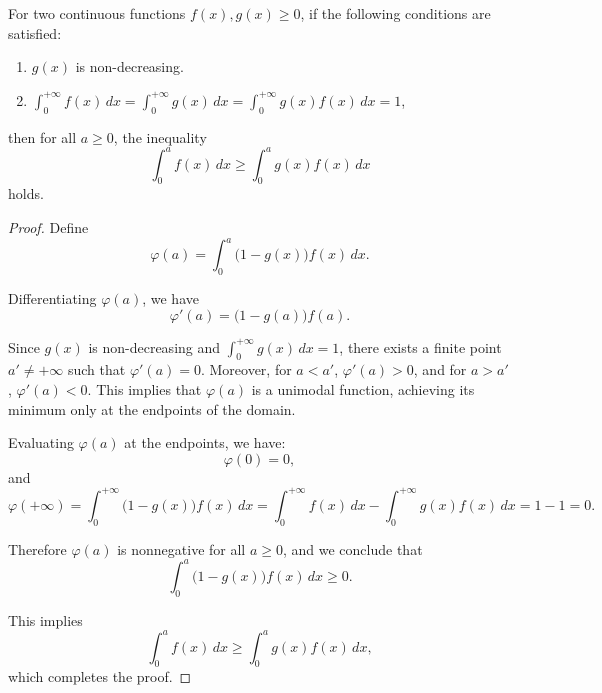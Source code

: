 \begin{lemma}\label{lem:StoDom}
    For two continuous functions \( f(x), g(x) \geq 0 \), if the following conditions are satisfied:
    \begin{enumerate}
        \item \( g(x) \) is non-decreasing.
        \item \( \int_0^{+\infty} f(x) \, dx = \int_0^{+\infty} g(x) \, dx = \int_0^{+\infty} g(x) f(x) \, dx = 1 \),
    \end{enumerate}
    then for all \( a \geq 0 \), the inequality 
    \[
    \int_0^{a} f(x) \, dx \geq \int_0^a g(x) f(x) \, dx
    \]
    holds.
\end{lemma}

\begin{proof}
    Define 
    \[
    \varphi(a) = \int_0^a \big(1 - g(x)\big) f(x) \, dx.
    \]
    
    Differentiating \(\varphi(a)\), we have
    \[
    \varphi'(a) = \big(1 - g(a)\big) f(a).
    \]
    
    Since \( g(x) \) is non-decreasing and \(\int_0^{+\infty} g(x) \, dx = 1\), there exists a finite point \( a' \neq +\infty \) such that \(\varphi'(a) = 0\). Moreover, for \( a < a' \), \(\varphi'(a) > 0\), and for \( a > a' \), \(\varphi'(a) < 0\). This implies that \(\varphi(a)\) is a unimodal function, achieving its minimum only at the endpoints of the domain.

    Evaluating \(\varphi(a)\) at the endpoints, we have:
    \[
    \varphi(0) = 0,
    \]
    and
    \[
    \varphi(+\infty) = \int_0^{+\infty} \big(1 - g(x)\big) f(x) \, dx = \int_0^{+\infty} f(x) \, dx - \int_0^{+\infty} g(x) f(x) \, dx = 1 - 1 = 0.
    \]
    
    Therefore \(\varphi(a)\) is nonnegative for all \( a \geq 0 \), and we conclude that
    \[
    \int_0^a \big(1 - g(x)\big) f(x) \, dx \geq 0.
    \]
    
    This implies
    \[
    \int_0^a f(x) \, dx \geq \int_0^a g(x) f(x) \, dx,
    \]
    which completes the proof.
\end{proof}

